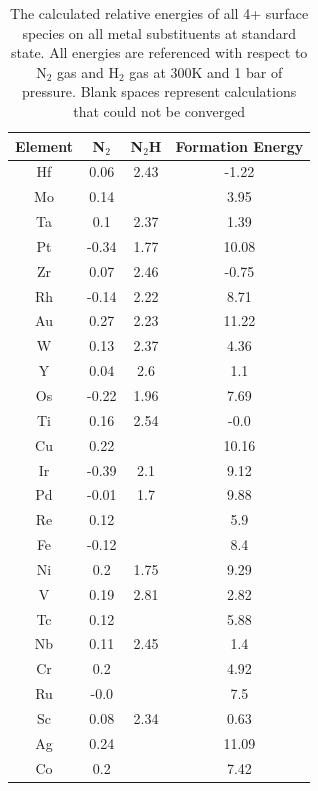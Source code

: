 \begin{table}
\begin{center}
\begin{tabular}{| c | c | c | c |}
\hline
Element & N$_2$ & N$_2$H & Formation Energy \\
\hline
Hf & 0.06 & 2.43 & -1.22 \\
Mo & 0.14 &  & 3.95 \\
Ta & 0.1 & 2.37 & 1.39 \\
Pt & -0.34 & 1.77 & 10.08 \\
Zr & 0.07 & 2.46 & -0.75 \\
Rh & -0.14 & 2.22 & 8.71 \\
Au & 0.27 & 2.23 & 11.22 \\
W & 0.13 & 2.37 & 4.36 \\
Y & 0.04 & 2.6 & 1.1 \\
Os & -0.22 & 1.96 & 7.69 \\
Ti & 0.16 & 2.54 & -0.0 \\
Cu & 0.22 &  & 10.16 \\
Ir & -0.39 & 2.1 & 9.12 \\
Pd & -0.01 & 1.7 & 9.88 \\
Re & 0.12 &  & 5.9 \\
Fe & -0.12 &  & 8.4 \\
Ni & 0.2 & 1.75 & 9.29 \\
V & 0.19 & 2.81 & 2.82 \\
Tc & 0.12 &  & 5.88 \\
Nb & 0.11 & 2.45 & 1.4 \\
Cr & 0.2 &  & 4.92 \\
Ru & -0.0 &  & 7.5 \\
Sc & 0.08 & 2.34 & 0.63 \\
Ag & 0.24 &  & 11.09 \\
Co & 0.2 &  & 7.42 \\
\hline
\end{tabular}
\end{center}
\caption{The calculated relative energies of all 4+ surface species on all metal substituents at standard state. All energies are referenced with respect to N$_2$ gas and H$_2$ gas at 300K and 1 bar of pressure. Blank spaces represent calculations that could not be converged}
\hline
\end{table}

